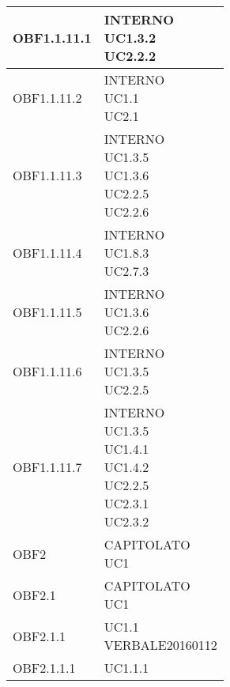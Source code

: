 \documentclass{scalatekids-article}
\begin{document}
\begin{longtable}[H]{|p{5.5cm}|p{5.5cm}|}
  \hline
  OBF1.1.11.1 & \multiLineCell[t]{INTERNO\\UC1.3.2\\UC2.2.2\\}\\
  \hline
  OBF1.1.11.2 & \multiLineCell[t]{INTERNO\\UC1.1\\UC2.1\\}\\
  \hline
  OBF1.1.11.3 & \multiLineCell[t]{INTERNO\\UC1.3.5\\UC1.3.6\\UC2.2.5\\UC2.2.6\\}\\
  \hline
  OBF1.1.11.4 & \multiLineCell[t]{INTERNO\\UC1.8.3\\UC2.7.3\\}\\
  \hline
  OBF1.1.11.5 & \multiLineCell[t]{INTERNO\\UC1.3.6\\UC2.2.6\\}\\
  \hline
  OBF1.1.11.6 & \multiLineCell[t]{INTERNO\\UC1.3.5\\UC2.2.5\\}\\
  \hline
  OBF1.1.11.7 & \multiLineCell[t]{INTERNO\\UC1.3.5\\UC1.4.1\\UC1.4.2\\UC2.2.5\\UC2.3.1\\UC2.3.2\\}\\
  \hline
  OBF2 & \multiLineCell[t]{CAPITOLATO\\UC1\\}\\
  \hline
  OBF2.1 & \multiLineCell[t]{CAPITOLATO\\UC1\\}\\
  \hline
  OBF2.1.1 & \multiLineCell[t]{UC1.1\\VERBALE20160112\\}\\
  \hline
  OBF2.1.1.1 & \multiLineCell[t]{UC1.1.1\\}\\

\end{longtable}
\end{document}
